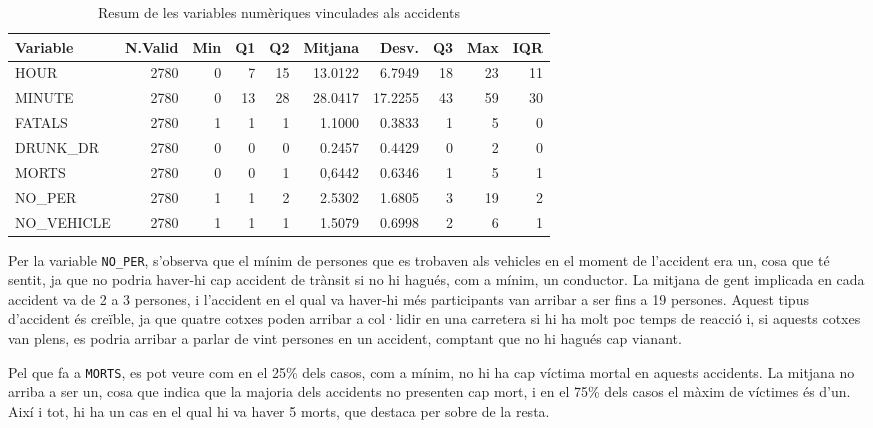 \documentclass[12pt,longbibliography]{article}
\theoremstyle{definition}
\theoremstyle{remark}
\begin{document}
\begin{table}[H]
\centering
\begin{tabular}{lrrrrrrrrr}
\hline
Variable    & N.Valid & Min & Q1 & Q2 & Mitjana    & Desv.  & Q3 & Max & IQR \\ \hline
HOUR        & 2780    & 0   & 7  & 15      & 13.0122 & 6.7949       & 18 & 23  & 11  \\ \hline
MINUTE      & 2780    & 0   & 13 & 28      & 28.0417 & 17.2255      & 43 & 59  & 30  \\ \hline
FATALS      & 2780    & 1   & 1  & 1       & 1.1000  & 0.3833       & 1  & 5   & 0   \\ \hline
DRUNK\_DR   & 2780    & 0   & 0  & 0       & 0.2457  & 0.4429       & 0  & 2   & 0   \\ \hline
MORTS       & 2780    & 0   & 0  & 1       & 0,6442  & 0.6346       & 1  & 5  & 1   \\ \hline
NO\_PER     & 2780    & 1   & 1  & 2       & 2.5302  & 1.6805       & 3  & 19  & 2   \\ \hline
NO\_VEHICLE & 2780    & 1   & 1  & 1       & 1.5079  & 0.6998       & 2  & 6   & 1   \\ \hline
\end{tabular}
\caption{Resum de les variables numèriques vinculades als accidents}
\label{tab:num2-table}
\end{table}





Per la variable \texttt{NO\_PER}, s'observa que el mínim de persones que es trobaven als vehicles en el moment de l'accident era un, cosa que té sentit, ja que no podria haver-hi cap accident de trànsit si no hi hagués, com a mínim, un conductor. La mitjana de gent implicada en cada accident va de 2 a 3 persones, i l'accident en el qual va haver-hi més participants van arribar a ser fins a 19 persones. Aquest tipus d'accident és creïble, ja que quatre cotxes poden arribar a col·lidir en una carretera si hi ha molt poc temps de reacció i, si aquests cotxes van plens, es podria arribar a parlar de vint persones en un accident, comptant que no hi hagués cap vianant.

Pel que fa a \texttt{MORTS}, es pot veure com en el 25\% dels casos, com a mínim, no hi ha cap víctima mortal en aquests accidents. La mitjana no arriba a ser un, cosa que indica que la majoria dels accidents no presenten cap mort, i en el 75\% dels casos el màxim de víctimes és d'un. Així i tot, hi ha un cas en el qual hi va haver 5 morts, que destaca per sobre de la resta. 
\end{document}
